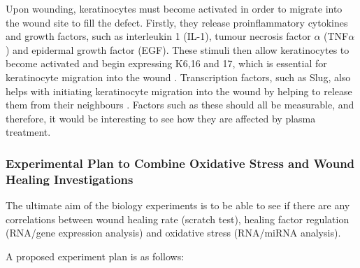 \documentclass[11pt, oneside]{article}   	%
\begin{document}
Upon wounding, keratinocytes must become activated in order to migrate into the wound site to fill the defect.
Firstly, they release proinflammatory cytokines and growth factors, such as interleukin 1 (IL-1), tumour necrosis factor $\alpha$ (TNF$\alpha$) and epidermal growth factor (EGF).
These stimuli then allow keratinocytes to become activated and begin expressing K6,16 and 17, which is essential for keratinocyte migration into the wound \cite{Pastar2014epithelialization}.
Transcription factors, such as Slug, also helps with initiating keratinocyte migration into the wound by helping to release them from their neighbours \cite{Pastar2014epithelialization, Savagner2005developmental}.
Factors such as these should all be measurable, and therefore, it would be interesting to see how they are affected by plasma treatment.

\subsubsection{Experimental Plan to Combine Oxidative Stress and Wound Healing Investigations}

The ultimate aim of the biology experiments is to be able to see if there are any correlations between wound healing rate (scratch test), healing factor regulation (RNA/gene expression analysis) and oxidative stress (RNA/miRNA analysis).

A proposed experiment plan is as follows:
\end{document}
